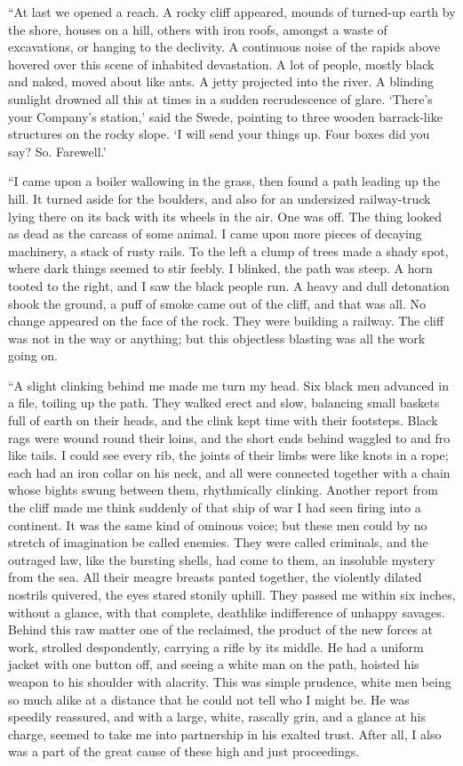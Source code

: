 \documentclass[12pt]{report}
\begin{document}
``At last we opened a reach. A rocky cliff appeared, mounds of turned-up
earth by the shore, houses on a hill, others with iron roofs, amongst a
waste of excavations, or hanging to the declivity. A continuous noise of
the rapids above hovered over this scene of inhabited devastation. A lot
of people, mostly black and naked, moved about like ants. A jetty
projected into the river. A blinding sunlight drowned all this at times
in a sudden recrudescence of glare. `There's your Company's station,'
said the Swede, pointing to three wooden barrack-like structures on the
rocky slope. `I will send your things up. Four boxes did you say? So.
Farewell.'

``I came upon a boiler wallowing in the grass, then found a path leading
up the hill. It turned aside for the boulders, and also for an
undersized railway-truck lying there on its back with its wheels in the
air. One was off. The thing looked as dead as the carcass of some
animal. I came upon more pieces of decaying machinery, a stack of rusty
rails. To the left a clump of trees made a shady spot, where dark things
seemed to stir feebly. I blinked, the path was steep. A horn tooted to
the right, and I saw the black people run. A heavy and dull detonation
shook the ground, a puff of smoke came out of the cliff, and that was
all. No change appeared on the face of the rock. They were building a
railway. The cliff was not in the way or anything; but this objectless
blasting was all the work going on.

``A slight clinking behind me made me turn my head. Six black men
advanced in a file, toiling up the path. They walked erect and slow,
balancing small baskets full of earth on their heads, and the clink kept
time with their footsteps. Black rags were wound round their loins, and
the short ends behind waggled to and fro like tails. I could see every
rib, the joints of their limbs were like knots in a rope; each had an
iron collar on his neck, and all were connected together with a chain
whose bights swung between them, rhythmically clinking. Another report
from the cliff made me think suddenly of that ship of war I had seen
firing into a continent. It was the same kind of ominous voice; but
these men could by no stretch of imagination be called enemies. They
were called criminals, and the outraged law, like the bursting shells,
had come to them, an insoluble mystery from the sea. All their meagre
breasts panted together, the violently dilated nostrils quivered, the
eyes stared stonily uphill. They passed me within six inches, without a
glance, with that complete, deathlike indifference of unhappy savages.
Behind this raw matter one of the reclaimed, the product of the new
forces at work, strolled despondently, carrying a rifle by its middle.
He had a uniform jacket with one button off, and seeing a white man on
the path, hoisted his weapon to his shoulder with alacrity. This was
simple prudence, white men being so much alike at a distance that he
could not tell who I might be. He was speedily reassured, and with a
large, white, rascally grin, and a glance at his charge, seemed to take
me into partnership in his exalted trust. After all, I also was a part
of the great cause of these high and just proceedings.
\end{document}
